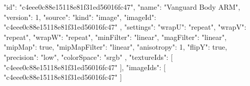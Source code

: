 {
  "id": "c4eee0c88e15118e81f31ed56016fc47",
  "name": "Vanguard Body ARM",
  "version": 1,
  "source": {
    "kind": "image",
    "imageId": "c4eee0c88e15118e81f31ed56016fc47"
  },
  "settings": {
    "wrapU": "repeat",
    "wrapV": "repeat",
    "wrapW": "repeat",
    "minFilter": "linear",
    "magFilter": "linear",
    "mipMap": true,
    "mipMapFilter": "linear",
    "anisotropy": 1,
    "flipY": true,
    "precision": "low",
    "colorSpace": "srgb"
  },
  "textureIds": [
    "c4eee0c88e15118e81f31ed56016fc47"
  ],
  "imageIds": [
    "c4eee0c88e15118e81f31ed56016fc47"
  ]
}
